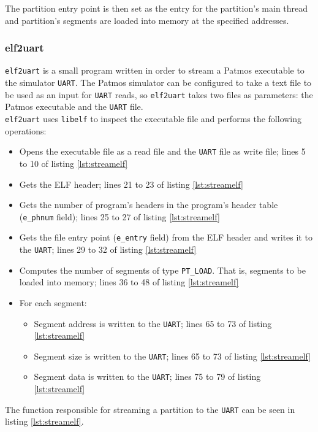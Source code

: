 The partition entry point is then set as the entry for the partition's main thread and partition's segments are loaded into memory at the specified addresses.

\subsubsection{elf2uart}\label{sec:elf2uart}

\texttt{elf2uart} is a small program written in order to stream a Patmos executable to the simulator \texttt{UART}. The Patmos simulator can be configured to take a text file to be used as an input for \texttt{UART} reads, so \texttt{elf2uart} takes two files as parameters: the Patmos executable and the \texttt{UART} file.\\ \texttt{elf2uart} uses \texttt{libelf} to inspect the executable file and performs the following operations:

\begin{itemize}
	\item Opens the executable file as a read file and the \texttt{UART} file as write file; lines 5 to 10 of listing \ref{lst:streamelf}
	\item Gets the ELF header; lines 21 to 23 of listing \ref{lst:streamelf}
	\item Gets the number of program's headers in the program's header table (\texttt{e\_phnum} field); lines 25 to 27 of listing \ref{lst:streamelf}
	\item Gets the file entry point (\texttt{e\_entry} field) from the ELF header and writes it to the \texttt{UART}; lines 29 to 32 of listing \ref{lst:streamelf}
	\item Computes the number of segments of type \texttt{PT\_LOAD}. That is, segments to be loaded into memory; lines 36 to 48 of listing \ref{lst:streamelf}
	\item For each segment:
		\begin{itemize}
			\item Segment address is written to the \texttt{UART}; lines 65 to 73 of listing \ref{lst:streamelf}
			\item Segment size is written to the \texttt{UART}; lines 65 to 73 of listing \ref{lst:streamelf}
			\item Segment data is written to the \texttt{UART}; lines 75 to 79 of listing \ref{lst:streamelf}
		\end{itemize}
\end{itemize}

The function responsible for streaming a partition to the \texttt{UART} can be seen in listing \ref{lst:streamelf}.

